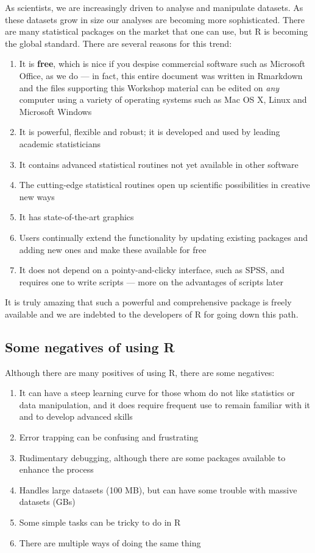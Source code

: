 \documentclass[]{book}
\theoremstyle{definition}
\theoremstyle{definition}
\theoremstyle{definition}
\theoremstyle{remark}
\begin{document}
As scientists, we are increasingly driven to analyse and manipulate
datasets. As these datasets grow in size our analyses are becoming more
sophisticated. There are many statistical packages on the market that
one can use, but R is becoming the global standard. There are several
reasons for this trend:

\begin{enumerate}
\def\labelenumi{\arabic{enumi}.}
\item
  It is \textbf{free}, which is nice if you despise commercial software
  such as Microsoft Office, as we do --- in fact, this entire document
  was written in Rmarkdown and the files supporting this Workshop
  material can be edited on \emph{any} computer using a variety of
  operating systems such as Mac OS X, Linux and Microsoft Windows
\item
  It is powerful, flexible and robust; it is developed and used by
  leading academic statisticians
\item
  It contains advanced statistical routines not yet available in other
  software
\item
  The cutting-edge statistical routines open up scientific possibilities
  in creative new ways
\item
  It has state-of-the-art graphics
\item
  Users continually extend the functionality by updating existing
  packages and adding new ones and make these available for free
\item
  It does not depend on a pointy-and-clicky interface, such as SPSS, and
  requires one to write scripts --- more on the advantages of scripts
  later
\end{enumerate}

It is truly amazing that such a powerful and comprehensive package is
freely available and we are indebted to the developers of R for going
down this path.

\subsection{Some negatives of using R}\label{some-negatives-of-using-r}

Although there are many positives of using R, there are some negatives:

\begin{enumerate}
\def\labelenumi{\arabic{enumi}.}
\item
  It can have a steep learning curve for those whom do not like
  statistics or data manipulation, and it does require frequent use to
  remain familiar with it and to develop advanced skills
\item
  Error trapping can be confusing and frustrating
\item
  Rudimentary debugging, although there are some packages available to
  enhance the process
\item
  Handles large datasets (100 MB), but can have some trouble with
  massive datasets (GBs)
\item
  Some simple tasks can be tricky to do in R
\item
  There are multiple ways of doing the same thing
\end{enumerate}
\end{document}
